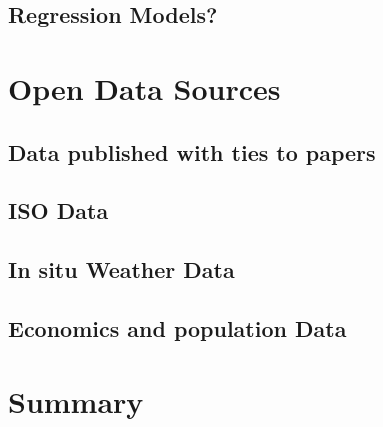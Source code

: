 \documentclass[lettersize,journal]{IEEEtran}
\begin{document}
  \subsection{Regression Models?}








\section{Open Data Sources}
  \subsection{Data published with ties to papers}
  \subsection{ISO Data}
  \subsection{In situ Weather Data}
  \subsection{Economics and population Data}

\section{Summary}
\end{document}
